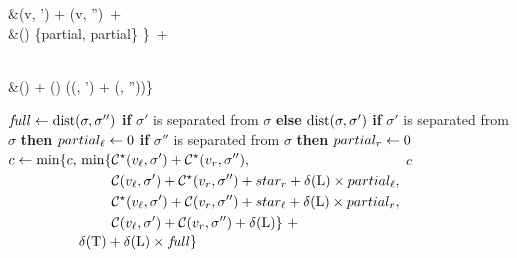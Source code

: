 \begin{algorithm}[htb!]
\begin{algorithmic}
\begin{aligned}[t]
\begin{aligned}[t]
                                &(v\lchild, \sigma') + (v\rchild, \sigma'')\ + \\
                                &\qquad\cost(\evtL) \times \min\{partial\lchild, partial\rchild\}
                                \}\ +
                            \end{aligned}\\[-.25em]
                            &\cost(\evtD) + \cost(\evtL) \times
                            (\tdist(\sigma, \sigma') +
                            \tdist(\sigma, \sigma''))\}
                        \end{aligned}\)
                        \State \(f\!ull \gets \mathrm{dist}(\sigma, \sigma'')\) \textbf{if} \(\sigma'\) is separated from \(\sigma\) \textbf{else} \(\mathrm{dist}(\sigma, \sigma')\)
                        \State \textbf{if} \(\sigma'\) is separated from \(\sigma\) \textbf{then} \(partial_\mathit{\ell} \gets 0\)
                        \State \textbf{if} \(\sigma''\) is separated from \(\sigma\) \textbf{then} \(partial_r \gets 0\)
                        \State \(c \gets \min\{c, \begin{aligned}[t]
                            &\min\{
                            \begin{aligned}[t]
                                &\mathcal{C^\star}(v_\mathit{\ell}, \sigma') + \mathcal{C^\star}(v_r, \sigma''),\\
                                &\mathcal{C}(v_\mathit{\ell}, \sigma') + \mathcal{C^\star}(v_r, \sigma'') +
                                    star_r +
                                    \delta\kern.1pt(\mathrm{L}) \times partial_\mathit{\ell},\\
                                &\mathcal{C^\star}(v_\mathit{\ell}, \sigma') + \mathcal{C}(v_r, \sigma'') +
                                    star_\mathit{\ell} +
                                    \delta\kern.1pt(\mathrm{L}) \times partial_r,\\
                                &\mathcal{C}(v_\mathit{\ell}, \sigma') + \mathcal{C}(v_r, \sigma'') + \delta\kern.1pt(\mathrm{L})
                                \}\ +
                            \end{aligned}\\[-.25em]
                            &\delta\kern.1pt(\mathrm{T}) + \delta\kern.1pt(\mathrm{L}) \times f\!ull\}
                        \end{aligned}\)
                    \EndIf
                \EndFor
                \State \Return \(c\)
            \EndIf
        \EndFunction
    \end{algorithmic}
    \caption{Computing the value of \(\dt{C}{v, \sigma}\)}
    \label{alg:superdtl:cmin-rec}
\end{algorithm}

